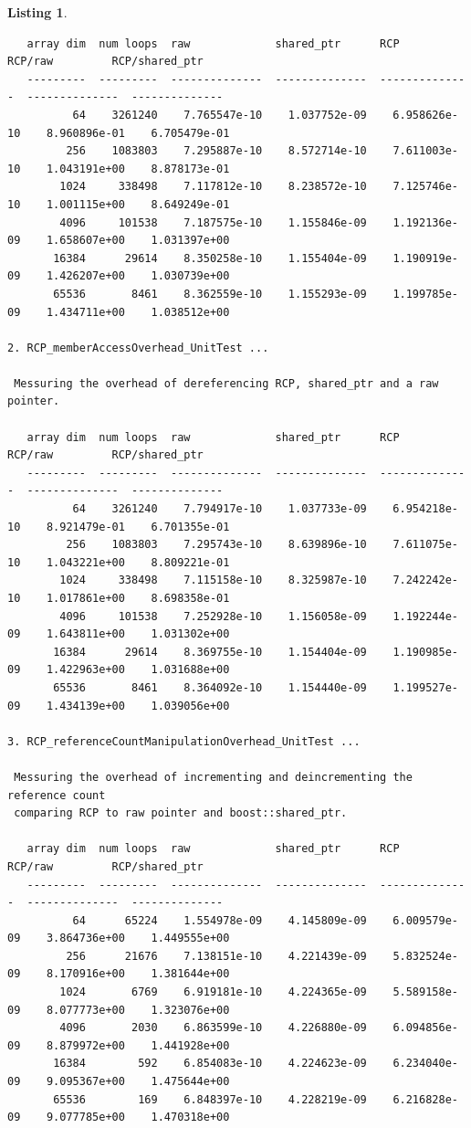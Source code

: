 \documentclass[pdf,ps2pdf,11pt]{SANDreport}
\newtheorem{listing}{Listing}
\begin{document}
\begin{listing}
{\begin{verbatim}
   array dim  num loops  raw             shared_ptr      RCP             RCP/raw         RCP/shared_ptr
   ---------  ---------  --------------  --------------  --------------  --------------  --------------
          64    3261240    7.765547e-10    1.037752e-09    6.958626e-10    8.960896e-01    6.705479e-01
         256    1083803    7.295887e-10    8.572714e-10    7.611003e-10    1.043191e+00    8.878173e-01
        1024     338498    7.117812e-10    8.238572e-10    7.125746e-10    1.001115e+00    8.649249e-01
        4096     101538    7.187575e-10    1.155846e-09    1.192136e-09    1.658607e+00    1.031397e+00
       16384      29614    8.350258e-10    1.155404e-09    1.190919e-09    1.426207e+00    1.030739e+00
       65536       8461    8.362559e-10    1.155293e-09    1.199785e-09    1.434711e+00    1.038512e+00

2. RCP_memberAccessOverhead_UnitTest ... 
 
 Messuring the overhead of dereferencing RCP, shared_ptr and a raw pointer.
 
   array dim  num loops  raw             shared_ptr      RCP             RCP/raw         RCP/shared_ptr
   ---------  ---------  --------------  --------------  --------------  --------------  --------------
          64    3261240    7.794917e-10    1.037733e-09    6.954218e-10    8.921479e-01    6.701355e-01
         256    1083803    7.295743e-10    8.639896e-10    7.611075e-10    1.043221e+00    8.809221e-01
        1024     338498    7.115158e-10    8.325987e-10    7.242242e-10    1.017861e+00    8.698358e-01
        4096     101538    7.252928e-10    1.156058e-09    1.192244e-09    1.643811e+00    1.031302e+00
       16384      29614    8.369755e-10    1.154404e-09    1.190985e-09    1.422963e+00    1.031688e+00
       65536       8461    8.364092e-10    1.154440e-09    1.199527e-09    1.434139e+00    1.039056e+00

3. RCP_referenceCountManipulationOverhead_UnitTest ... 
 
 Messuring the overhead of incrementing and deincrementing the reference count
 comparing RCP to raw pointer and boost::shared_ptr.
 
   array dim  num loops  raw             shared_ptr      RCP             RCP/raw         RCP/shared_ptr
   ---------  ---------  --------------  --------------  --------------  --------------  --------------
          64      65224    1.554978e-09    4.145809e-09    6.009579e-09    3.864736e+00    1.449555e+00
         256      21676    7.138151e-10    4.221439e-09    5.832524e-09    8.170916e+00    1.381644e+00
        1024       6769    6.919181e-10    4.224365e-09    5.589158e-09    8.077773e+00    1.323076e+00
        4096       2030    6.863599e-10    4.226880e-09    6.094856e-09    8.879972e+00    1.441928e+00
       16384        592    6.854083e-10    4.224623e-09    6.234040e-09    9.095367e+00    1.475644e+00
       65536        169    6.848397e-10    4.228219e-09    6.216828e-09    9.077785e+00    1.470318e+00
\end{verbatim}}
\end{listing}
\end{document}
